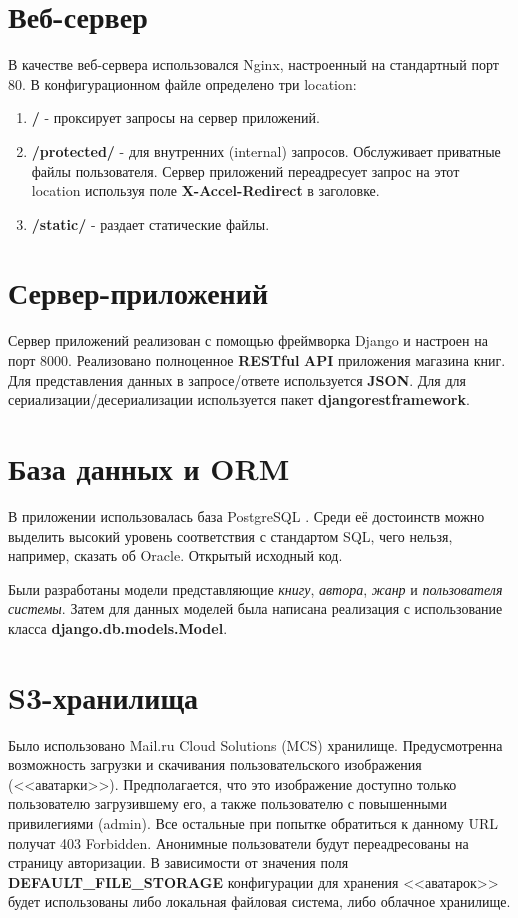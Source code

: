 \section{Веб-сервер}
В качестве веб-сервера использовался Nginx, настроенный на стандартный порт 80. В конфигурационном файле определено три location:
\begin{enumerate} 
  \item \textbf{/} - проксирует запросы на сервер приложений.
  \item \textbf{/protected/} - для внутренних (internal) запросов. Обслуживает приватные файлы пользователя. Сервер приложений переадресует запрос на этот location используя поле \textbf{X-Accel-Redirect} в заголовке.
  \item \textbf{/static/} - раздает статические файлы.
\end{enumerate}
\section{Сервер-приложений}
Сервер приложений реализован с помощью фреймворка Django и настроен на порт 8000. Реализовано полноценное \textbf{RESTful} \textbf{API} приложения магазина книг. Для представления данных в запросе/ответе используется \textbf{JSON}. Для для сериализации/десериализации используется пакет \textbf{djangorestframework}.
\section{База данных и ORM}
В приложении использовалась база PostgreSQL \cite{postgresql_documentation}. Среди её достоинств можно выделить высокий уровень соответствия с стандартом SQL, чего нельзя, например, сказать об Oracle. Открытый исходный код.

Были разработаны модели представляющие \textit{книгу}, \textit{автора}, \textit{жанр} и \textit{пользователя системы}. Затем для данных моделей была написана реализация с использование класса \textbf{django.db.models.Model}.
\section{S3-хранилища}
Было использовано Mail.ru Cloud Solutions (MCS) хранилище. Предусмотренна возможность загрузки и скачивания пользовательского изображения (<<аватарки>>). Предполагается, что это изображение доступно только пользователю загрузившему его, а также пользователю с повышенными привилегиями (admin). Все остальные при попытке обратиться к данному URL получат 403 Forbidden. Анонимные пользователи будут переадресованы на страницу авторизации. В зависимости от значения поля \textbf{DEFAULT\_FILE\_STORAGE} конфигурации для хранения <<аватарок>> будет использованы либо локальная файловая система, либо облачное хранилище.
